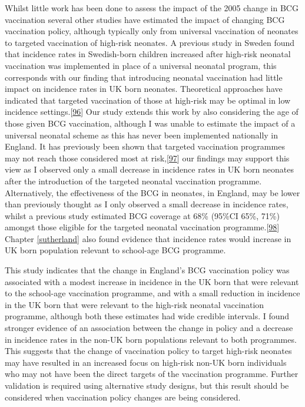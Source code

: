 \documentclass[11pt,twoside]{bristolthesis}
\begin{document}
  Whilst little work has been done to assess the impact of the 2005 change in BCG vaccination several other studies have estimated the impact of changing BCG vaccination policy, although typically only from universal vaccination of neonates to targeted vaccination of high-risk neonates. A previous study in Sweden found that incidence rates in Swedish-born children increased after high-risk neonatal vaccination was implemented in place of a universal neonatal program, this corresponds with our finding that introducing neonatal vaccination had little impact on incidence rates in UK born neonates. Theoretical approaches have indicated that targeted vaccination of those at high-risk may be optimal in low incidence settings.{[}\protect\hyperlink{ref-Manissero2008}{96}{]} Our study extends this work by also considering the age of those given BCG vaccination, although I was unable to estimate the impact of a universal neonatal scheme as this has never been implemented nationally in England. It has previously been shown that targeted vaccination programmes may not reach those considered most at risk,{[}\protect\hyperlink{ref-Feiring2016}{97}{]} our findings may support this view as I observed only a small decrease in incidence rates in UK born neonates after the introduction of the targeted neonatal vaccination programme. Alternatively, the effectiveness of the BCG in neonates, in England, may be lower than previously thought as I only observed a small decrease in incidence rates, whilst a previous study estimated BCG coverage at 68\% (95\%CI 65\%, 71\%) amongst those eligible for the targeted neonatal vaccination programme.{[}\protect\hyperlink{ref-Nguipdop-Djomo2014}{98}{]} Chapter \ref{sutherland} also found evidence that incidence rates would increase in UK born population relevant to school-age BCG programme.
  
  This study indicates that the change in England's BCG vaccination policy was associated with a modest increase in incidence in the UK born that were relevant to the school-age vaccination programme, and with a small reduction in incidence in the UK born that were relevant to the high-risk neonatal vaccination programme, although both these estimates had wide credible intervals. I found stronger evidence of an association between the change in policy and a decrease in incidence rates in the non-UK born populations relevant to both programmes. This suggests that the change of vaccination policy to target high-risk neonates may have resulted in an increased focus on high-risk non-UK born individuals who may not have been the direct targets of the vaccination programme. Further validation is required using alternative study designs, but this result should be considered when vaccination policy changes are being considered.
  
\end{document}
